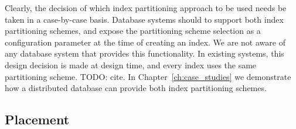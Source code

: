 Clearly, the decision of which index partitioning approach to be used needs be taken in a case-by-case basis.
Database systems should to support both index partitioning schemes, and expose the partitioning scheme selection as a
configuration parameter at the time of creating an index.
We are not aware of any database system that provides this functionality.
In existing systems, this design decision is made at design time, and every index uses the same partitioning scheme.
\cite{}
  TODO: cite.
In Chapter~\ref{ch:case_studies} we demonstrate how a distributed database can provide both index partitioning
schemes.



\subsection{Placement}
\label{sec:placement}

\bigskpip










